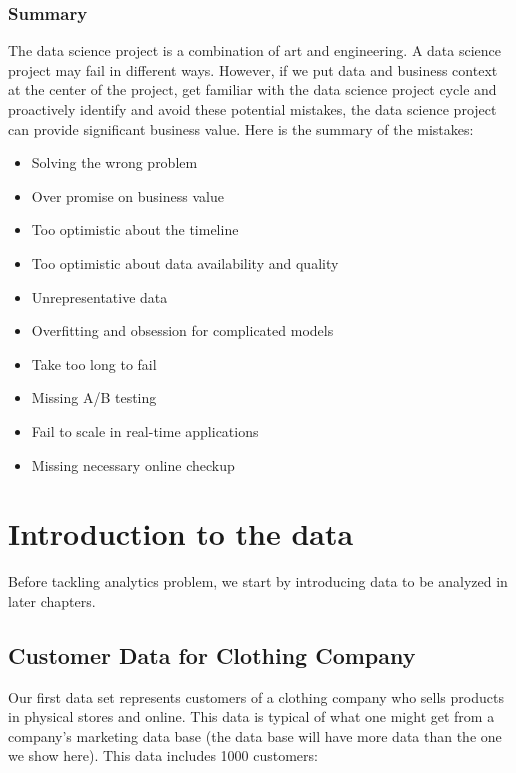 \documentclass[12pt,]{krantz}
\providecommand{\tightlist}{%
  \setlength{\itemsep}{0pt}\setlength{\parskip}{0pt}}
\theoremstyle{definition}
\theoremstyle{definition}
\theoremstyle{definition}
\theoremstyle{remark}
\begin{document}
\subsection{Summary}\label{summary-1}

The data science project is a combination of art and engineering. A data
science project may fail in different ways. However, if we put data and
business context at the center of the project, get familiar with the
data science project cycle and proactively identify and avoid these
potential mistakes, the data science project can provide significant
business value. Here is the summary of the mistakes:

\begin{itemize}
\tightlist
\item
  Solving the wrong problem
\item
  Over promise on business value
\item
  Too optimistic about the timeline
\item
  Too optimistic about data availability and quality
\item
  Unrepresentative data
\item
  Overfitting and obsession for complicated models
\item
  Take too long to fail
\item
  Missing A/B testing
\item
  Fail to scale in real-time applications
\item
  Missing necessary online checkup
\end{itemize}

\chapter{Introduction to the data}\label{introduction-to-the-data}

Before tackling analytics problem, we start by introducing data to be
analyzed in later chapters.

\section{Customer Data for Clothing
Company}\label{customer-data-for-clothing-company}

Our first data set represents customers of a clothing company who sells
products in physical stores and online. This data is typical of what one
might get from a company's marketing data base (the data base will have
more data than the one we show here). This data includes 1000 customers:
\end{document}
